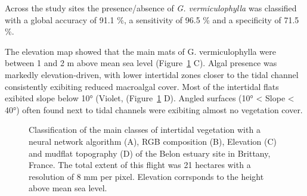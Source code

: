 \documentclass[
  letterpaper,
  DIV=11,
  numbers=noendperiod]{scrartcl}
\begin{document}
Across the study sites the presence/absence of \emph{G. vermiculophylla}
was classified with a global accuracy of 91.1 \%, a sensitivity of 96.5
\% and a specificity of 71.5 \%.

The elevation map showed that the main mats of G. vermiculophylla were
between 1 and 2 m above mean sea level (Figure~\ref{fig-Belon} C). Algal
presence was markedly elevation-driven, with lower intertidal zones
closer to the tidal channel consistently exibiting reduced macroalgal
cover. Most of the intertidal flats exibited slope below 10° (Violet,
(Figure~\ref{fig-Belon} D). Angled surfaces (10° \textless{} Slope
\textless{} 40°) often found next to tidal channels were exibiting
almost no vegetation cover.

\label{cell-fig-Belon}
\begin{figure}[H]


\caption{\label{fig-Belon}Classification of the main classes of
intertidal vegetation with a neural network algorithm (A), RGB
composition (B), Elevation (C) and mudflat topography (D) of the Belon
estuary site in Brittany, France. The total extent of this flight was 21
hectares with a resolution of 8 mm per pixel. Elevation corrsponds to
the height above mean sea level.}

\end{figure}%
\end{document}
